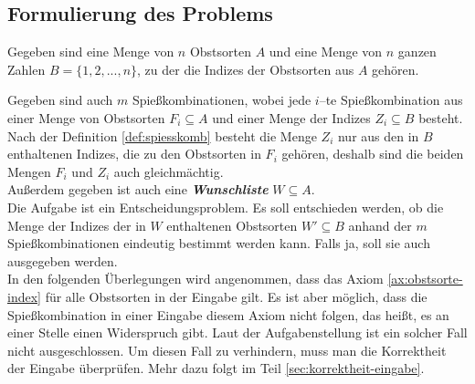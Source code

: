 \subsection{Formulierung des Problems}\label{sec:formulierung}


Gegeben sind eine Menge von $n$ Obstsorten $A$ und eine Menge von $n$ ganzen Zahlen
$B = \{1, 2, ..., n\}$, zu der die Indizes der Obstsorten aus $A$ gehören.



Gegeben sind auch $m$ Spießkombinationen, wobei jede $i$--te Spießkombination
aus einer Menge von Obstsorten $F_i \subseteq A$ und einer Menge der Indizes $Z_i \subseteq B$ besteht. 
Nach der Definition \ref{def:spiesskomb} besteht die Menge $Z_i$ nur aus
den in $B$ enthaltenen Indizes, die zu den Obstsorten in $F_i$ gehören, deshalb sind die beiden Mengen
$F_i$ und $Z_i$ auch gleichmächtig.\\
\indent Außerdem gegeben ist auch eine \textit{\textbf{Wunschliste}} $W \subseteq A$.\\

Die Aufgabe ist ein Entscheidungsproblem. Es soll entschieden werden,
ob die Menge der Indizes der in $W$ enthaltenen Obstsorten $W' \subseteq B$ anhand der $m$ 
Spießkombinationen eindeutig bestimmt werden kann. Falls ja, soll sie auch ausgegeben werden.\\

In den folgenden Überlegungen wird angenommen, dass das Axiom \ref{ax:obstsorte-index} für alle
Obstsorten in der Eingabe gilt.
Es ist aber möglich, dass die Spießkombination in einer Eingabe diesem Axiom nicht folgen, das heißt,
es an einer Stelle einen Widerspruch gibt.
Laut der Aufgabenstellung ist ein solcher Fall nicht ausgeschlossen. 
Um diesen Fall zu verhindern, muss man die Korrektheit der Eingabe überprüfen. 
Mehr dazu folgt im Teil \ref{sec:korrektheit-eingabe}.
